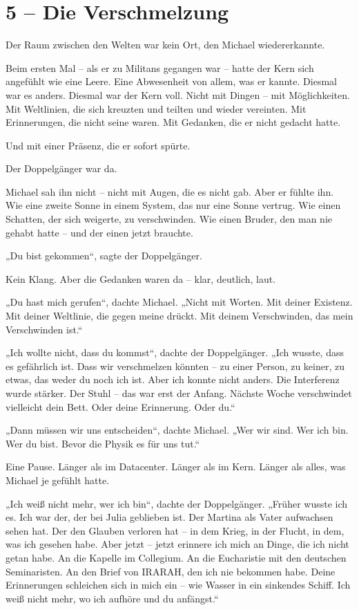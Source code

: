 \documentclass[
]{article}
\begin{document}
\section{5 -- Die Verschmelzung}\label{die-verschmelzung}

Der Raum zwischen den Welten war kein Ort, den Michael wiedererkannte.

Beim ersten Mal -- als er zu Militans gegangen war -- hatte der Kern sich angefühlt wie eine Leere. Eine Abwesenheit von allem, was er kannte. Diesmal war es anders. Diesmal war der Kern voll. Nicht mit Dingen -- mit Möglichkeiten. Mit Weltlinien, die sich kreuzten und teilten und wieder vereinten. Mit Erinnerungen, die nicht seine waren. Mit Gedanken, die er nicht gedacht hatte.

Und mit einer Präsenz, die er sofort spürte.

Der Doppelgänger war da.

Michael sah ihn nicht -- nicht mit Augen, die es nicht gab. Aber er fühlte ihn. Wie eine zweite Sonne in einem System, das nur eine Sonne vertrug. Wie einen Schatten, der sich weigerte, zu verschwinden. Wie einen Bruder, den man nie gehabt hatte -- und der einen jetzt brauchte.

„Du bist gekommen``, sagte der Doppelgänger.

Kein Klang. Aber die Gedanken waren da -- klar, deutlich, laut.

„Du hast mich gerufen``, dachte Michael. „Nicht mit Worten. Mit deiner Existenz. Mit deiner Weltlinie, die gegen meine drückt. Mit deinem Verschwinden, das mein Verschwinden ist.``

„Ich wollte nicht, dass du kommst``, dachte der Doppelgänger. „Ich wusste, dass es gefährlich ist. Dass wir verschmelzen könnten -- zu einer Person, zu keiner, zu etwas, das weder du noch ich ist. Aber ich konnte nicht anders. Die Interferenz wurde stärker. Der Stuhl -- das war erst der Anfang. Nächste Woche verschwindet vielleicht dein Bett. Oder deine Erinnerung. Oder du.``

„Dann müssen wir uns entscheiden``, dachte Michael. „Wer wir sind. Wer ich bin. Wer du bist. Bevor die Physik es für uns tut.``

Eine Pause. Länger als im Datacenter. Länger als im Kern. Länger als alles, was Michael je gefühlt hatte.

„Ich weiß nicht mehr, wer ich bin``, dachte der Doppelgänger. „Früher wusste ich es. Ich war der, der bei Julia geblieben ist. Der Martina als Vater aufwachsen sehen hat. Der den Glauben verloren hat -- in dem Krieg, in der Flucht, in dem, was ich gesehen habe. Aber jetzt -- jetzt erinnere ich mich an Dinge, die ich nicht getan habe. An die Kapelle im Collegium. An die Eucharistie mit den deutschen Seminaristen. An den Brief von IRARAH, den ich nie bekommen habe. Deine Erinnerungen schleichen sich in mich ein -- wie Wasser in ein sinkendes Schiff. Ich weiß nicht mehr, wo ich aufhöre und du anfängst.``
\end{document}
